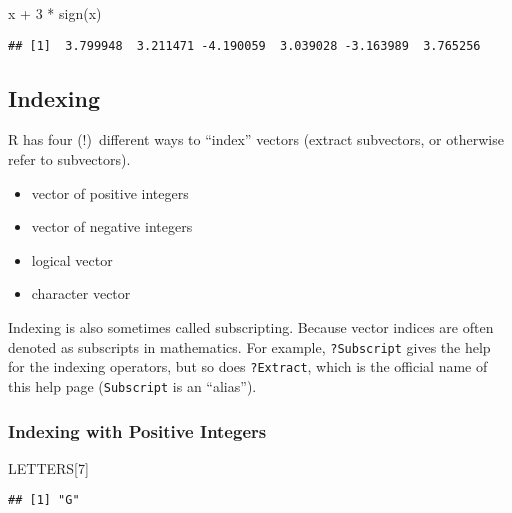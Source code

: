 \documentclass[
]{article}
\newenvironment{Shaded}{\begin{snugshade}}{\end{snugshade}}
\newcommand{\DecValTok}[1]{\textcolor[rgb]{0.00,0.00,0.81}{#1}}
\newcommand{\FunctionTok}[1]{\textcolor[rgb]{0.00,0.00,0.00}{#1}}
\newcommand{\NormalTok}[1]{#1}
\newcommand{\SpecialCharTok}[1]{\textcolor[rgb]{0.00,0.00,0.00}{#1}}
\providecommand{\tightlist}{%
  \setlength{\itemsep}{0pt}\setlength{\parskip}{0pt}}
\begin{document}
\begin{Shaded}
\begin{Highlighting}[]
\NormalTok{x }\SpecialCharTok{+} \DecValTok{3} \SpecialCharTok{*} \FunctionTok{sign}\NormalTok{(x)}
\end{Highlighting}
\end{Shaded}

\begin{verbatim}
## [1]  3.799948  3.211471 -4.190059  3.039028 -3.163989  3.765256
\end{verbatim}

\hypertarget{indexing}{%
\subsection{Indexing}\label{indexing}}

R has four (!)~different ways to ``index'' vectors (extract subvectors,
or otherwise refer to subvectors).

\begin{itemize}
\tightlist
\item
  vector of positive integers
\item
  vector of negative integers
\item
  logical vector
\item
  character vector
\end{itemize}

Indexing is also sometimes called subscripting. Because vector indices
are often denoted as subscripts in mathematics. For example,
\texttt{?Subscript} gives the help for the indexing operators, but so
does \texttt{?Extract}, which is the official name of this help page
(\texttt{Subscript} is an ``alias'').

\hypertarget{indexing-with-positive-integers}{%
\subsubsection{Indexing with Positive
Integers}\label{indexing-with-positive-integers}}

\begin{Shaded}
\begin{Highlighting}[]
\NormalTok{LETTERS[}\DecValTok{7}\NormalTok{]}
\end{Highlighting}
\end{Shaded}

\begin{verbatim}
## [1] "G"
\end{verbatim}
\end{document}
